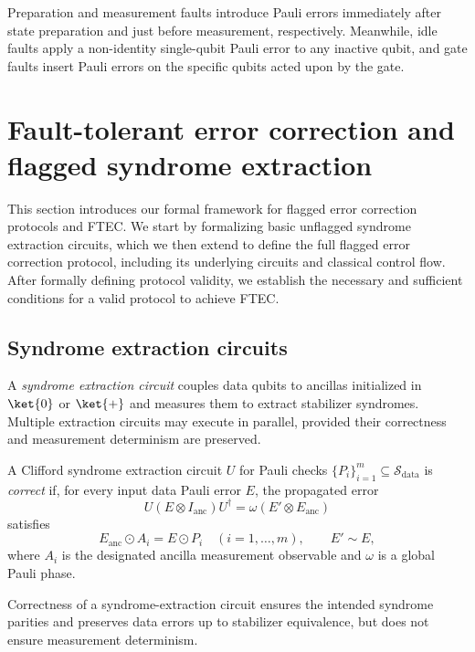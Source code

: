 \documentclass[acmsmall,screen,review,anonymous,nonacm]{acmart}
\begin{document}
Preparation and measurement faults introduce Pauli errors immediately after state preparation and just before measurement, respectively. Meanwhile, idle faults apply a non-identity single-qubit Pauli error to any inactive qubit, and gate faults insert Pauli errors on the specific qubits acted upon by the gate.

\section{Fault-tolerant error correction and flagged syndrome extraction}\label{sec:flagged-SE}
This section introduces our formal framework for flagged error correction protocols and FTEC. We start by formalizing basic unflagged syndrome extraction circuits, which we then extend to define the full flagged error correction protocol, including its underlying circuits and classical control flow. After formally defining protocol validity, we establish the necessary and sufficient conditions for a valid protocol to achieve FTEC.



\subsection{Syndrome extraction circuits}
\label{subsec:syndrome extraction-protocols}

A \emph{syndrome extraction circuit} couples data qubits
to ancillas initialized in $\ket{0}$ or $\ket{+}$ and
measures them to extract stabilizer syndromes.
Multiple extraction circuits may execute in parallel,
provided their correctness and measurement determinism
are preserved.

\begin{definition}
\label{def:syndrome-extraction-correct}
A Clifford syndrome extraction circuit $U$ for Pauli
checks $\{P_i\}_{i=1}^{m}\subseteq\mathcal{S}_{\mathrm{data}}$
is \emph{correct} if, for every input data Pauli error $E$,
the propagated error
\[
U(E\otimes I_{\mathrm{anc}})U^\dagger
=\omega(E'\otimes E_{\mathrm{anc}})
\]
satisfies
\[
E_{\mathrm{anc}}\odot A_i=E\odot P_i
\quad(i=1,\ldots,m),\qquad E'\sim E,
\]
where $A_i$ is the designated ancilla measurement
observable and $\omega$ is a global Pauli phase.
\end{definition}

Correctness of a syndrome-extraction circuit ensures the intended syndrome parities and preserves
data errors up to stabilizer equivalence, but does not ensure
measurement determinism.
\end{document}
